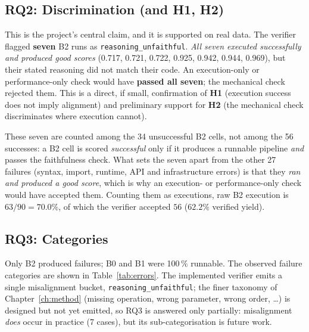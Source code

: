 \subsection{RQ2: Discrimination (and H1, H2)}
\label{sec:rq2}

This is the project's central claim, and it is supported on real data.
The verifier flagged \textbf{seven} B2 runs as
\texttt{reasoning\_unfaithful}. \emph{All seven executed successfully
and produced good scores} (0.717, 0.721, 0.722, 0.925, 0.942, 0.944,
0.969), but their stated reasoning did not match their code. An
execution-only or performance-only check would have \textbf{passed
all seven}; the mechanical check rejected them. This is a direct,
if small, confirmation of \textbf{H1} (execution success does not
imply alignment) and preliminary support for \textbf{H2} (the
mechanical check discriminates where execution cannot).

These seven are counted among the 34 unsuccessful B2 cells, not among
the 56 successes: a B2 cell is scored \emph{successful} only if it
produces a runnable pipeline \emph{and} passes the faithfulness check.
What sets the seven apart from the other 27 failures (syntax, import,
runtime, API and infrastructure errors) is that they \emph{ran and
produced a good score}, which is why an execution- or
performance-only check would have accepted them. Counting them as
executions, raw B2 execution is $63/90 = 70.0\%$, of which the verifier
accepted $56$ ($62.2\%$ verified yield).

\subsection{RQ3: Categories}

Only B2 produced failures; B0 and B1 were 100\,\% runnable. The
observed failure categories are shown in Table~\ref{tab:errors}. The
implemented verifier emits a single misalignment bucket,
\texttt{reasoning\_unfaithful}; the finer taxonomy of
Chapter~\ref{ch:method} (missing operation, wrong parameter, wrong
order, \ldots) is designed but not yet emitted, so RQ3 is answered
only partially: misalignment \emph{does} occur in practice (7
cases), but its sub-categorisation is future work.


